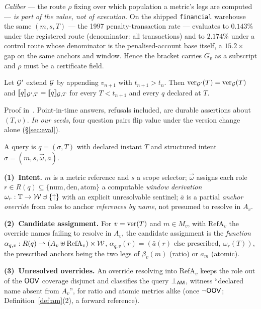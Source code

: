 \emph{Caliber} --- the route $\rho$ fixing over which population a
metric's legs are computed --- \emph{is part of the value, not of
execution.} On the shipped
\texttt{financial} warehouse the same $(m,s,T)$ --- the 1997 penalty-transaction
rate --- evaluates to $0.143\%$ under the registered route (denominator: all
transactions) and to $2.174\%$ under a control route whose denominator is the
penalised-account base itself, a $15.2\times$ gap on the same anchors and
window. Hence the bracket carries $G_v$ as a subscript and $\rho$
must be a certificate field.

\begin{lemma}
\label{lem:stability}
 Let $\mathcal{G}'$ extend $\mathcal{G}$ by appending $v_{n+1}$ with $t_{n+1}>t_n$. Then
$\mathrm{ver}_{\mathcal{G}'}(T)=\mathrm{ver}_{\mathcal{G}}(T)$ and
$[\![q]\!]_{\mathcal{G}',T}=[\![q]\!]_{\mathcal{G},T}$ for every $T<t_{n+1}$ and every $q$
declared at $T$.
\end{lemma}

\noindent{} Proof in~\cite{asofgov-tr}. Point-in-time answers, refusals included,
are durable assertions about $(T,v)$. \emph{In our seeds}, four
question pairs flip value under the version change alone
(\S\ref{sec:eval}).

\begin{definition}
\label{def:query}\label{def:alpha}
 A query is $q=(\sigma,T)$ with declared instant $T$ and structured intent
$\sigma=(m,s,\vec\omega,\bar a)$.
\par\noindent\textbf{(1)~Intent.} $m$ is a metric reference and $s$ a scope
selector; $\vec\omega$ assigns each role
$r\in R(q)\subseteq\{\mathrm{num},\mathrm{den},\mathrm{atom}\}$ a computable
\emph{window derivation} $\omega_r:\mathbb{T}\to\mathcal{W}\uplus\{\uparrow\}$ with an
explicit unresolvable sentinel; $\bar a$ is a partial \emph{anchor override}
from roles to anchor \emph{references by name}, not presumed to resolve in
$A_v$.
\par\noindent\textbf{(2)~Candidate assignment.} For $v=\mathrm{ver}(T)$
and $m\in M_v$, with $\mathrm{RefA}_v$ the override names failing to resolve
in $A_v$, the candidate assignment is the \emph{function}
$\alpha_{q,v}:R(q)\rightharpoonup(A_v\uplus\mathrm{RefA}_v)\times\mathcal{W}$,
$\alpha_{q,v}(r)=(\bar a(r)\text{ else prescribed},\ \omega_r(T))$, the
prescribed anchors being the two legs of $\beta_v(m)$ (ratio) or $a_m$
(atomic).
\par\noindent\textbf{(3)~Unresolved overrides.} An override resolving into
$\mathrm{RefA}_v$ keeps the role out of the $\mathsf{OOV}$ coverage disjunct and
classifies the query $\bot_{\mathsf{AM}}$, witness ``declared name absent from
$A_v$'', for ratio and atomic metrics alike (once $\neg\mathsf{OOV}$;
Definition~\ref{def:am}(2), a forward reference).
\end{definition}

